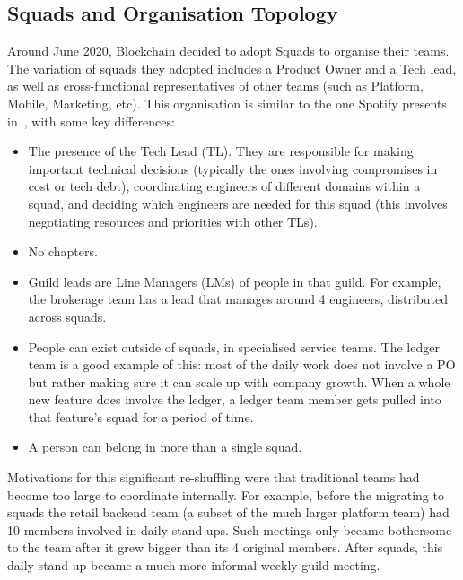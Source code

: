 \documentclass[conference]{IEEEtran}
\begin{document}

    \subsection{Squads and Organisation Topology}\label{subsec:squads}

    Around June 2020, Blockchain decided to adopt Squads to organise their teams.
    The variation of squads they adopted includes a Product Owner and a Tech lead, as well as cross-functional representatives of other teams (such as Platform, Mobile, Marketing, etc).
    This organisation is similar to the one Spotify presents in~\cite{spotifySquads}, with some key differences:
    \begin{itemize}
        \item The presence of the Tech Lead (TL).
        They are responsible for making important technical decisions (typically the ones involving compromises in cost or tech debt), coordinating engineers of different domains within a squad, and deciding which engineers are needed for this squad (this involves negotiating resources and priorities with other TLs).
        \item No chapters.
        \item Guild leads are Line Managers (LMs) of people in that guild.
        For example, the brokerage team has a lead that manages around 4 engineers, distributed across squads.
        \item People can exist outside of squads, in specialised service teams.
        The ledger team is a good example of this: most of the daily work does not involve a PO but rather making sure it can scale up with company growth.
        When a whole new feature does involve the ledger, a ledger team member gets pulled into that feature's squad for a period of time.
        \item A person can belong in more than a single squad.
    \end{itemize}

    Motivations for this significant re-shuffling were that traditional teams had become too large to coordinate internally.
    For example, before the migrating to squads the retail backend team (a subset of the much larger platform team) had 10 members involved in daily stand-ups.
    Such meetings only became bothersome to the team after it grew bigger than its 4 original members.
    After squads, this daily stand-up became a much more informal weekly guild meeting.
\end{document}
